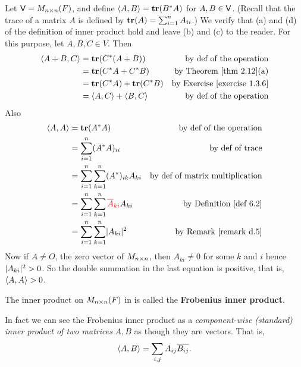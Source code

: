 \begin{example} \label{example 6.1.5}
Let \(\textsf{V} = M_{n \times n}(F)\), and define \(\left< A, B \right> = \textbf{tr}(B^* A)\) for \(A, B \in \textsf{V}\).
(Recall that the trace of a matrix \(A\) is defined by \(\textbf{tr}(A) = \sum_{i = 1}^n A_{ii}\).)
We verify that (a) and (d) of the definition of inner product hold and leave (b) and (c) to the reader. For this purpose, let \(A, B, C \in V\).
Then
\begin{align*}
    \LG A + B, C \RG & = \TRACE(C^* (A + B)) & \text{by def of the operation} \\
        & = \TRACE(C^* A + C^* B) & \text{by \THM{2.12}(a)} \\
        & = \TRACE(C^* A) + \TRACE(C^* B) & \text{by \EXEC{1.3.6}} \\
        & = \LG A, C \RG + \LG B, C \RG & \text{by def of the operation}
\end{align*}
Also
\begin{align*}
    \LG A, A \RG & = \TRACE(A^* A) & \text{by def of the operation} \\
        & = \sum_{i = 1}^n (A^* A)_{ii} & \text{by def of trace} \\
        & = \sum_{i = 1}^n \sum_{k = 1}^n (A^*)_{ik} A_{ki} & \text{by def of matrix multiplication} \\
        & = \sum_{i = 1}^n \sum_{k = 1}^n \RED{\conjugatet{A}_{ki}} A_{ki} & \text{by \DEF{6.2}} \\
        & = \sum_{i = 1}^n \sum_{k = 1}^n \abs{A_{ki}}^2 & \text{by \RMK{d.5}}
\end{align*}
Now if \(A \ne O\), the zero vector of \(M_{n \times n}\), then \(A_{ki} \ne 0\) for some \(k\) and \(i\) hence \(\lvert A_{ki}\rvert^2 > 0\).
So the double summation in the last equation is positive, that is, \(\left< A, A \right> > 0\).
\end{example}

\begin{additional definition} \label{adef 6.1}
The inner product on \(M_{n \times n}(F)\) in  is called the \textbf{Frobenius inner product}.
\end{additional definition}

\begin{remark} \label{remark 6.1.5}
In fact we can see the Frobenius inner product as a \emph{component-wise (standard) inner product of two matrices} \(A, B\) as though they are vectors.
That is,
\[
    \left< A, B \right> = \sum_{i, j} A_{ij} \overline{B_{ij}}.
\]
\end{remark}

